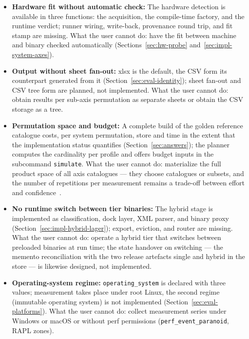 \begin{nurkurz}
\begin{itemize}
  (Table~\ref{tab:le:limitierung}, row~1). What the user cannot do: obtain L2 and coherence counters on
  models other than Zen~5 (Figure~\ref{fig:measurement-triangle}).
  \item \textbf{Hardware fit without automatic check:} The hardware detection is available in three
  functions: the acquisition, the compile-time factory, and the runtime verdict; runner wiring,
  write-back, provenance round trip, and fit stamp are missing. What the user cannot do: have the fit
  between machine and binary checked automatically (Sections~\ref{sec:hw-probe}
  and~\ref{sec:impl-system-axes}).
  \item \textbf{Output without sheet fan-out:} xlsx is the default, the CSV form its counterpart
  generated from it (Section~\ref{sec:eval-identity}); sheet fan-out and CSV tree form are planned, not
  implemented. What the user cannot do: obtain results per sub-axis permutation as separate sheets or
  obtain the CSV storage as a tree.
  \item \textbf{Permutation space and budget:} A complete build of the golden reference catalogue costs,
  per system permutation, store and time in the extent that the implementation status quantifies
  (Section~\ref{sec:answers}); the planner computes the cardinality per profile and offers budget inputs
  in the subcommand \texttt{simulate}. What the user cannot do: materialize the full product space of all
  axis catalogues --- they choose catalogues or subsets, and the number of repetitions per measurement
  remains a trade-off between effort and confidence~\cite{kalibera2013rigorous}.
  \item \textbf{No runtime switch between tier binaries:} The hybrid stage is implemented as
  classification, dock layer, XML parser, and binary proxy (Section~\ref{sec:impl-hybrid-lager}); export,
  eviction, and router are missing. What the user cannot do: operate a hybrid tier that switches between
  preloaded binaries at run time; the state handover on switching --- the memento reconciliation with the
  two release artefacts single and hybrid in the store --- is likewise designed, not implemented.
  \item \textbf{Operating-system regime:} \texttt{operating\_system} is declared with three values;
  measurement takes place under root Linux, the second regime (immutable operating system) is not
  implemented (Section~\ref{sec:eval-platforms}). What the user cannot do: collect measurement series
  under Windows or macOS or without perf permissions (\texttt{perf\_event\_paranoid}, RAPL zones).

\end{itemize}
\end{nurkurz}
